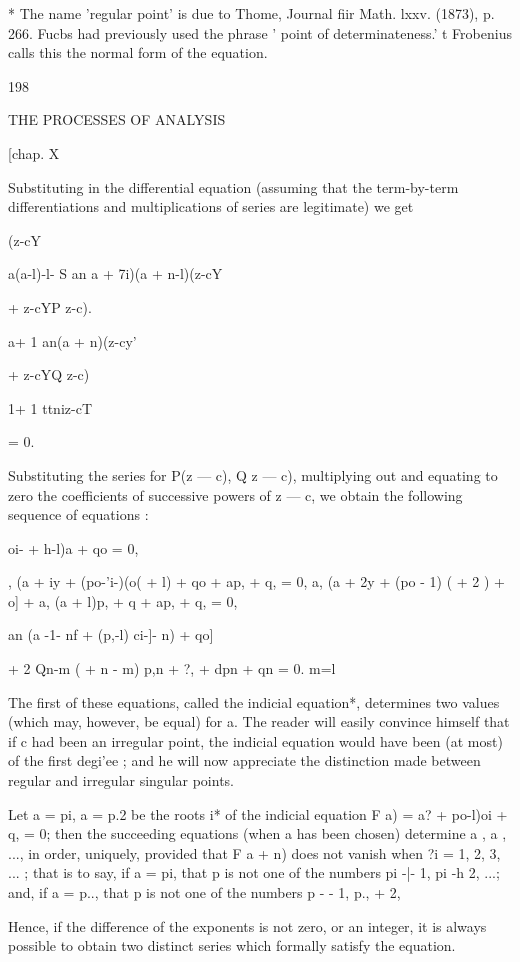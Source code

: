 * The name 'regular point' is due to Thome, Journal fiir Math. lxxv.
(1873), p. 266. Fucbs had previously used the phrase ' point of
determinateness.' t Frobenius calls this the normal form of the
equation.

198

THE PROCESSES OF ANALYSIS

[chap. X

Substituting in the differential equation (assuming that the
term-by-term differentiations and multiplications of series are
legitimate) we get

(z-cY

a(a-l)-l- S an a + 7i)(a + n-l)(z-cY

+ z-cYP z-c).

a+ 1 an(a + n)(z-cy'

+ z-cYQ z-c)

1+ 1 ttniz-cT

= 0.

Substituting the series for P(z — c), Q z — c), multiplying out and
equating to zero the coefficients of successive powers of z — c, we
obtain the following sequence of equations :

oi- + h-l)a + qo = 0,

 , (a + iy + (po-'i-)(o( + l) + qo + ap, + q, = 0, a, (a + 2y + (po -
1) ( + 2 ) + o] + a, (a + l)p, + q + ap, + q, = 0,

an (a -1- nf + (p,-l) ci-]- n) + qo]

+ 2 Qn-m ( + n - m) p,n + ?, + dpn + qn = 0. m=l

The first of these equations, called the indicial equation*,
determines two values (which may, however, be equal) for a. The reader
will easily convince himself that if c had been an irregular point,
the indicial equation would have been (at most) of the first degi'ee ;
and he will now appreciate the distinction made between regular and
irregular singular points.

Let a = pi, a = p.2 be the roots i* of the indicial equation F a) = a?
+ po-l)oi + q, = 0; then the succeeding equations (when a has been
chosen) determine a , a , ..., in order, uniquely, provided that F a +
n) does not vanish when ?i = 1, 2, 3, ... ; that is to say, if a = pi,
that p is not one of the numbers pi -|- 1, pi -h 2, ...; and, if a =
p.., that p is not one of the numbers p - - 1, p., + 2,

Hence, if the difference of the exponents is not zero, or an integer,
it is always possible to obtain two distinct series which formally
satisfy the equation.

